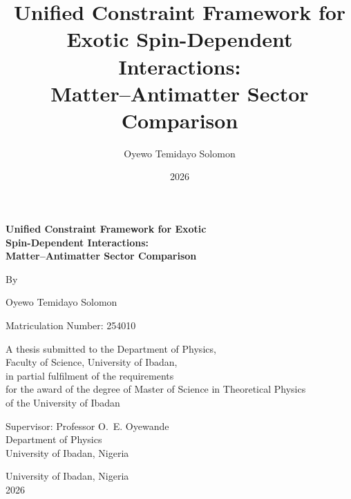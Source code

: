 \documentclass[12pt,a4paper]{report}
\title{Unified Constraint Framework for Exotic Spin-Dependent Interactions:\\
Matter--Antimatter Sector Comparison}
\author{Oyewo Temidayo Solomon}
\date{2026}
\begin{document}
\begin{titlepage}
\centering
\vspace*{2cm}

{\LARGE \bfseries Unified Constraint Framework for Exotic\\[0.3em]
Spin-Dependent Interactions:\\[0.3em]
Matter--Antimatter Sector Comparison\par}

\vspace{2.5cm}

{\large By\par}

\vspace{0.4cm}

{\Large Oyewo Temidayo Solomon\par}
{\large Matriculation Number: 254010\par}

\vspace{1.5cm}

{\large A thesis submitted to the Department of Physics,\\
Faculty of Science, University of Ibadan,\\
in partial fulfilment of the requirements\\
for the award of the degree of Master of Science in Theoretical Physics\\
of the University of Ibadan\par}

\vspace{2cm}

{\large Supervisor: Professor O.~E. Oyewande\\
Department of Physics\\
University of Ibadan, Nigeria\par}

\vfill

{\large University of Ibadan, Nigeria\\
2026\par}

\end{titlepage}

\end{document}
